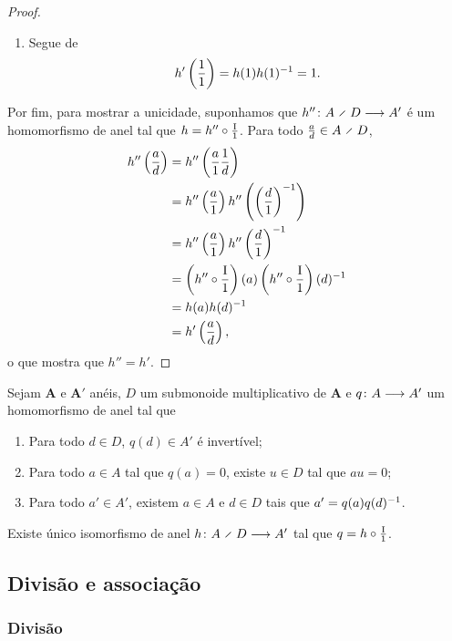 \begin{proof}
\begin{enumerate}
\begin{enumerate}
		\item Segue de
			\begin{equation*}
			h' \left( \frac{1}{1} \right) = h(1)h(1)^{-1} = 1.
			\end{equation*}
		\end{enumerate}
	\end{enumerate}

Por fim, para mostrar a unicidade, suponhamos que $\fun{h''}{A \olddiv D}{A'}$ é um homomorfismo de anel tal que $h = h'' \circ \frac{\mathrm{I}}{1}$. Para todo $\frac{a}{d} \in A \olddiv D$,
	\begin{align*}
	h'' \left( \frac{a}{d} \right) &= h'' \left( \frac{a}{1}\frac{1}{d} \right) \\
		&= h'' \left( \frac{a}{1} \right) h'' \left( \left( \frac{d}{1} \right)^{-1} \right) \\
		&= h'' \left( \frac{a}{1} \right) h'' \left( \frac{d}{1} \right)^{-1} \\
		&= \left( h'' \circ \frac{\mathrm{I}}{1} \right) (a) \left( h'' \circ \frac{\mathrm{I}}{1} \right) (d)^{-1} \\
		&= h(a)h(d)^{-1} \\
		&= h' \left( \frac{a}{d} \right),
	\end{align*}
o que mostra que $h''=h'$.
\end{proof}

\begin{exercise}
Sejam $\bm A$ e $\bm A'$ anéis, $D$ um submonoide multiplicativo de $\bm A$ e ${q}\colon {A} \longrightarrow {A'}$ um homomorfismo de anel tal que
	\begin{enumerate}
	\item Para todo $d \in D$, $q(d) \in A'$ é invertível;
	
	\item Para todo $a \in A$ tal que $q(a)=0$, existe $u \in D$ tal que $au=0$;
	
	\item Para todo $a' \in A'$, existem $a \in A$ e $d \in D$ tais que $a' = q(a)q(d)^{-1}$.
	\end{enumerate}
Existe único isomorfismo de anel $\fun{h}{A \olddiv D}{A'}$ tal que $q = h \circ \frac{\mathrm{I}}{1}$.
\end{exercise}

\subsection{Divisão e associação}

\subsubsection{Divisão}

